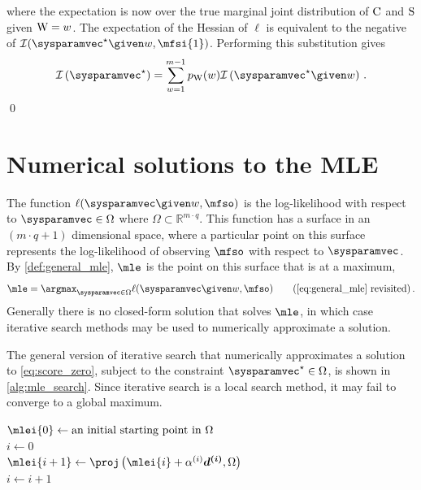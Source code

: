 \documentclass[../main.tex]{subfiles}
\begin{document}
where the expectation is now over the true marginal joint distribution of $\mathrm{C}$ and $\mathrm{S}$ given $\mathrm{W} = w$. The expectation of the Hessian of $\ell$ is equivalent to the negative of $\infomatrx(\tparam\sysparamvec \given w, \mfsi{1})$. Performing this substitution gives
\begin{equation}
    \infomatrx\left(\tparam\sysparamvec\right) = \sum_{w=1}^{m-1} \pmf_{\RV{W}}(w) \infomatrx\left(\tparam\sysparamvec \given w\right)\,.
\end{equation}
\qed

\chapter{Numerical solutions to the MLE}
\label{appendix:numerical_solution}
The function $\ell(\sysparamvec \given w, \mfso)$ is the log-likelihood with respect to $\sysparamvec \in \Omega$ where $\Omega \subset \mathbb{R}^{m \cdot q}$. This function has a surface in an $(m \cdot q+1)$ dimensional space, where a particular point on this surface represents the log-likelihood of observing $\mfso$ with respect to $\sysparamvec$. By \cref{def:general_mle}, $\mle$ is the point on this surface that is at a maximum,
\begin{equation*}
    \mle = \argmax_{\sysparamvec \in \Omega} \ell(\sysparamvec \given w, \mfso)
    \tag{\ref{eq:general_mle} revisited}\,.
\end{equation*}
Generally there is no closed-form solution that solves $\mle$, in which case iterative search methods may be used to numerically approximate a solution.

The general version of iterative search that numerically approximates a solution to \cref{eq:score_zero}, subject to the constraint $\tparam\sysparamvec \in \Omega$, is shown in \cref{alg:mle_search}. Since iterative search is a local search method, it may fail to converge to a global maximum.
\begin{algorithm}[h]
\DontPrintSemicolon
{}
\BlankLine
{}
\func{$\findmle${}{$(\mfso)$}}
{
    $\mlei{0} \gets \text{an initial starting point in $\Omega$}$\\
    $i \gets 0$\\
    {
        $\mlei{i+1} \gets \proj\left(\mlei{i} + \alpha^{(i)} \vec{d^{(i)}}, \Omega\right)$\\
        $i \gets i + 1$\\
    }
}
\caption{Iterative maximum likelihood search}
\label{alg:mle_search}
\end{algorithm}
\end{document}
